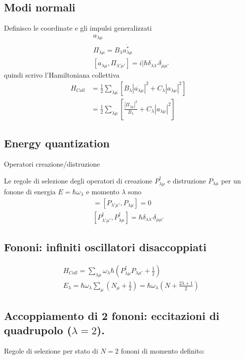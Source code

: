 \subsection{Modi normali}
Definisco le coordinate e gli impulsi generalizzati
\begin{align*}
&a_{\lambda\mu}\\
&\Pi_{\lambda\mu}=B_{\lambda}\dot{a_{\lambda\mu}^*}\\
&[a_{\lambda\mu},\Pi_{\lambda'\mu'}]=i|\hbar\delta_{\lambda\lambda'}\delta_{\mu\mu'}
\end{align*}
quindi scrivo l'Hamiltoniana collettiva
\begin{align*}
H_{Coll}&=\frac{1}{2}\sum_{\lambda\mu}[B_{\lambda}|\dot{a_{\lambda\mu}}|^2+C_{\lambda}|a_{\lambda\mu}|^2]\\
&=\frac{1}{2}\sum_{\lambda\mu}[\frac{|\Pi_{\lambda\mu}|^2}{B_{\lambda}}+C_{\lambda}|a_{\lambda\mu}|^2]
\end{align*}

\subsection{Energy quantization}

Operatori creazione/distruzione

Le regole di selezione degli operatori di creazione $P^{\dag}_{\lambda\mu}$ e distruzione $P_{\lambda\mu}$ per un fonone di energia $E=\hbar\omega_{\lambda}$ e momento $\lambda$ sono
\begin{align*}
[P^{\dag}_{\lambda'\mu'},P^{\dag}_{\lambda\mu}]=[P_{\lambda'\mu'},P_{\lambda\mu}]=0\\
[P^{\dag}_{\lambda'\mu'},P^{\dag}_{\lambda\mu}]=\hbar\delta_{\lambda\lambda'}\delta_{\mu\mu'}
\end{align*}

\subsection{Fononi: infiniti oscillatori disaccoppiati}
\begin{align*}
&H_{Coll}=\sum_{\lambda\mu}\omega_{\lambda}\hbar(P^{\dag}_{\lambda\mu}P_{\lambda\mu'}+\frac{1}{2})\\
&E_{\lambda}=\hbar\omega_{\lambda}\sum_{\mu}(N_{\mu}+\frac{1}{2})=\hbar\omega_{\lambda}(N+\frac{2\lambda+1}{2})
\end{align*}

\subsection{Accoppiamento di 2 fononi: eccitazioni di quadrupolo ($\lambda=2$).}
Regole di selezione per stato di $N=2$ fononi di momento definito:

